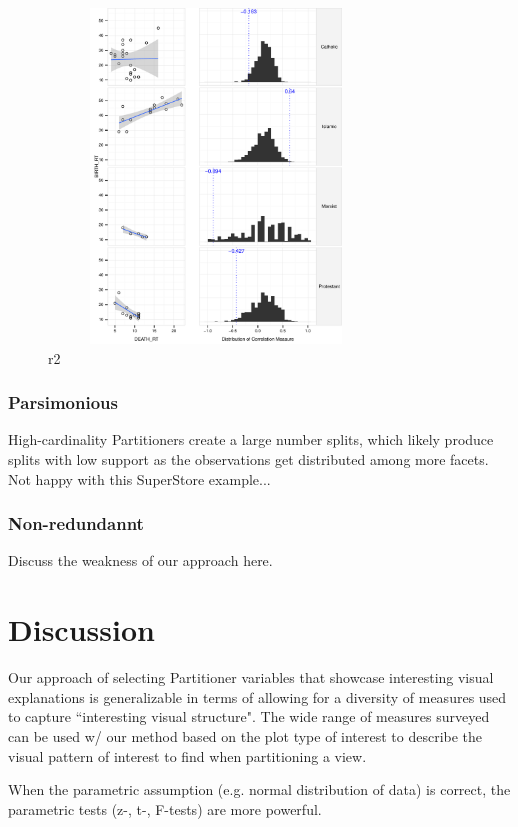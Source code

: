\begin{figure}
\raggedleft
\includegraphics[width=3.5in,height=3.5in]{images/2_48595929670884-LEADER.pdf}
  \caption{r2}
 \label{fig:r2-leader}
\end{figure}

\subsubsection{Parsimonious}
High-cardinality Partitioners create a large number splits, which likely produce splits with low support as the observations get distributed among more facets. Not happy with this SuperStore example...

\subsubsection{Non-redundannt}
Discuss the weakness of our approach here.


\section{Discussion}
\label{sec:discussion}
Our approach of selecting Partitioner variables that showcase interesting visual explanations is generalizable in terms of allowing for a diversity of measures used to capture ``interesting visual structure". The wide range of measures surveyed~\cite{Bertini2011} can be used w/ our method based on the plot type of interest to describe the visual pattern of interest to find when partitioning a view.

When the parametric assumption (e.g. normal
distribution of data) is correct, the parametric
tests (z-, t-, F-tests) are more powerful.

